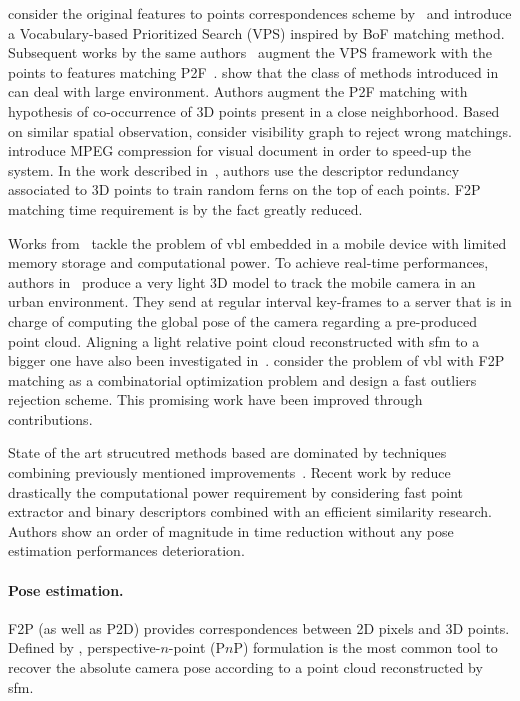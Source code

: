 \citet{Sattler2011} consider the original features to points correspondences scheme by~\citep{Irschara2009} and introduce a Vocabulary-based Prioritized Search (VPS) inspired by BoF matching method. Subsequent works by the same authors~\citep{Sattler2012} augment the VPS framework with the points to features matching P2F~\citep{Li2010}. \citet{Li2012} show that the class of methods introduced in~\citep{Irschara2009,Li2010} can deal with large environment. Authors augment the P2F matching with hypothesis of co-occurrence of 3D points present in a close neighborhood. Based on similar spatial observation, \citet{Sattler2015} consider visibility graph to reject wrong matchings. \citet{Heisterklaus2014} introduce MPEG compression for visual document in order to speed-up the system. In the work described in~\citep{Donoser2014}, authors use the descriptor redundancy associated to 3D points to train random ferns on the top of each points. F2P matching time requirement is by the fact greatly reduced. 

Works from~\citep{Middelberg2014,Lynen2015} tackle the problem of \ac{vbl} embedded in a mobile device with limited memory storage and computational power. To achieve real-time performances, authors in~\citep{Middelberg2014} produce a very light 3D model to track the mobile camera in an urban environment. They send at regular interval key-frames to a server that is in charge of computing the global pose of the camera regarding a pre-produced point cloud. Aligning a light relative point cloud reconstructed with \ac{sfm} to a bigger one have also been investigated in~\citep{Lu2015}. \citet{Svarm2014} consider the problem of \ac{vbl} with F2P matching as a combinatorial optimization problem and design a fast outliers rejection scheme. This promising work have been improved through~\citep{Zeisl2015,Svarm2016} contributions.

State of the art strucutred methods based are dominated by techniques combining previously mentioned improvements~\citep{Sattler2016a}. Recent work by \citet{Feng2016a} reduce drastically the computational power requirement by considering fast point extractor and binary descriptors combined with an efficient similarity research. Authors show an order of magnitude in time reduction without any pose estimation performances deterioration.

\paragraph{Pose estimation.}
F2P (as well as P2D) provides correspondences between 2D pixels and 3D points. Defined by \citet{Hartley2003}, perspective-$n$-point (P$n$P) formulation is the most common tool to recover the absolute camera pose according to a point cloud reconstructed by \ac{sfm}.

